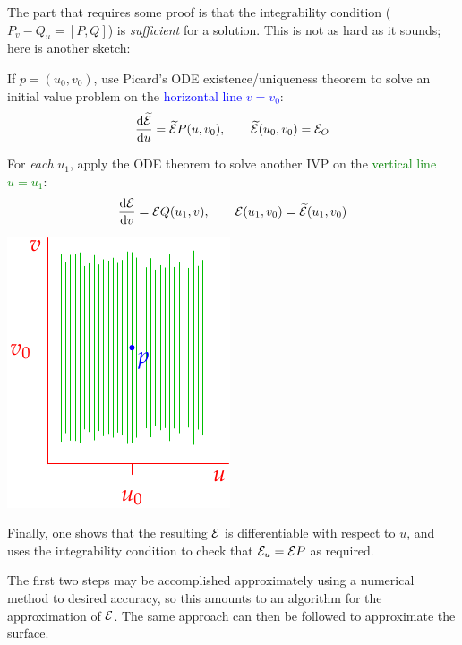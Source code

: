 The part that requires some proof is that the integrability condition ($P_v-Q_u=[P,Q]$) is \emph{sufficient} for a solution. This is not as hard as it sounds; here is another sketch:
\begin{enumerate}
  \begin{minipage}[t]{0.7\linewidth}\vspace{0pt}
  	\item If $p=(u_0,v_0)$, use Picard's ODE existence/uniqueness theorem to solve an initial value problem on the \textcolor{blue}{horizontal line $v=v_0$}:
  	\[
  		\diff[\widetilde\cE]{u}=\widetilde\cE P(u,v_0),\qquad \widetilde\cE(u_0,v_0)=\cE_O
		\]
  
  	\item For \emph{each} $u_1$, apply the ODE theorem to solve another IVP on the \textcolor{Green}{vertical line $u=u_1$}:
  	\[
  		\diff[\cE]{v}=\cE Q(u_1,v),\qquad \cE(u_1,v_0)=\widetilde\cE(u_1,v_0)
		\]
  \end{minipage}
  \hfill
  \begin{minipage}[t]{0.29\linewidth}\vspace{0pt}
  	\flushright\includegraphics{adaptive-frobenius}
  \end{minipage}
  \item Finally, one shows that the resulting $\cE$ is differentiable with respect to $u$, and uses the integrability condition to check that $\cE_u=\cE P$ as required.
\end{enumerate}

The first two steps may be accomplished approximately using a numerical method to desired accuracy, so this amounts to an algorithm for the approximation of $\cE$. The same approach can then be followed to approximate the surface.

